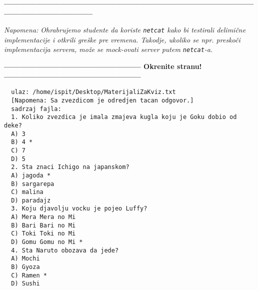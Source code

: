 \documentclass[]{article}
\begin{document}
\begin{enumerate}
\vspace{15pt}
\begin{center}
  \textbf{------------------------------------------------------------------------------------------------------------------------------}
\end{center}
\textit{Napomena: Ohrabrujemo studente da koriste \texttt{netcat} kako bi testirali delimi\v{c}ne implementacije i otkrili gre\v{s}ke pre vremena. Takodje, ukoliko se npr. presko\v{c}i implementacija servera, mo\v{z}e se mock-ovati server putem \texttt{netcat}-a.} 
\begin{center}
  \textbf{--------------------------------------------------- Okrenite stranu! ---------------------------------------------------}
\end{center}
\newpage

\noindent
\begin{lstlisting}
  ulaz: /home/ispit/Desktop/MaterijaliZaKviz.txt
  [Napomena: Sa zvezdicom je odredjen tacan odgovor.]
  sadrzaj fajla:
  1. Koliko zvezdica je imala zmajeva kugla koju je Goku dobio od deke?
  A) 3
  B) 4 *
  C) 7
  D) 5
  2. Sta znaci Ichigo na japanskom?
  A) jagoda *
  B) sargarepa
  C) malina
  D) paradajz
  3. Koju djavolju vocku je pojeo Luffy?
  A) Mera Mera no Mi
  B) Bari Bari no Mi
  C) Toki Toki no Mi
  D) Gomu Gomu no Mi *
  4. Sta Naruto obozava da jede?
  A) Mochi
  B) Gyoza
  C) Ramen *
  D) Sushi
\end{lstlisting}

\vspace{15pt}


\end{enumerate}
\end{document}
